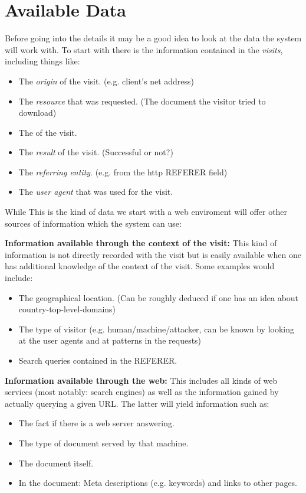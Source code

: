 \documentclass[a4paper]{danarticle}
\begin{document}
  \section*{Available Data}
    Before going into the details it may be a good idea to look
    at the data the system will work with. To start with there
    is the information contained in the \textit{visits}, including
    things like:
    \begin{itemize}
    	\item{The \textit{origin} of the visit. (e.g.
    	      client's net address)}
    	\item{The \textit{resource} that was requested. (The document
    	      the visitor tried to download)}
    	\item{The  of the visit.}
    	\item{The \textit{result} of the visit. (Successful or not?)}
    	\item{The \textit{referring entity}. (e.g. from the http REFERER field)}
    	\item{The \textit{user agent} that was used for the visit.}
    \end{itemize}
    While This is the kind of data we start with a web enviroment will
    offer other sources of information which the system can use:
    
    \textbf{Information available through the context of the visit:}
    This kind of information is not directly recorded with the visit
    but is easily available when one has additional knowledge of the
    context of the visit. Some examples would include:
    \begin{itemize}
    	\item{The geographical location. (Can be roughly deduced if 
    	      one has an idea about country-top-level-domains)}
    	\item{The type of visitor (e.g. human/machine/attacker,
    	      can be known by looking at the user agents and
    	      at patterns in the requests)}
    	\item{Search queries contained in the REFERER.}
    \end{itemize}
    
    \textbf{Information available through the web:} This includes
    all kinds of web services (most notably: search engines) as
    well as the information gained by actually querying a given
    URL. The latter will yield information such as:
    \begin{itemize}
    	\item{The fact if there is a web server answering.}
    	\item{The type of document served by that machine.}
    	\item{The document itself.}
    	\item{In the document: Meta descriptions (e.g. keywords)
    	      and links to other pages.}
    \end{itemize}
    
\end{document}
